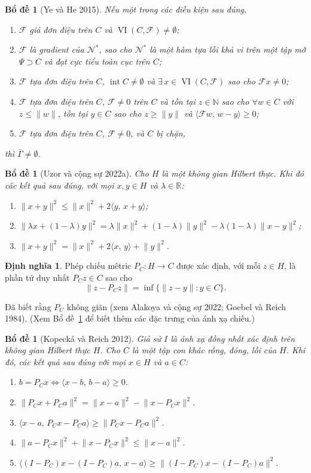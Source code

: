 \documentclass{MyBook}
\theoremstyle{plain}
\newtheorem{lemma}[theorem]{Bổ đề}
\theoremstyle{definition}
\newtheorem{definition}[theorem]{Định nghĩa}
\theoremstyle{remark}
\numberwithin{equation}{chapter}
\newcommand{\Fc}{\mathcal{F}}
\newcommand{\Nc}{\mathcal{N}}
\newcommand{\inp}[2]{\langle #1,\,#2\rangle}
\newcommand{\nm}[1]{\lVert #1\rVert}
\newcommand{\R}{\mathbb{R}}
\newcommand{\N}{\mathbb{N}}
\DeclareMathOperator{\VI}{VI}
\newcommand{\Gam}{\bar{\Gamma}}
\begin{document}
\begin{lemma}[Ye và He 2015]\label{lem:2.4}
Nếu một trong các điều kiện sau đúng,
\begin{enumerate}[label=(\roman*)]
\item $\Fc$ giả đơn điệu trên $C$ và $\VI(C,\Fc)\ne\emptyset$;
\item $\Fc$ là gradient của $\Nc^{*}$, sao cho $\Nc^{*}$ là một hàm tựa lồi khả vi trên một tập mở $\Psi\supset C$ và đạt cực tiểu toàn cục trên $C$;
\item $\Fc$ tựa đơn điệu trên $C$, $\operatorname{int}C\ne\emptyset$ và $\exists\,x\in\VI(C,\Fc)$ sao cho $\Fc x\ne 0$;
\item $\Fc$ tựa đơn điệu trên $C$, $\Fc\ne 0$ trên $C$ và tồn tại $z\in\N$ sao cho $\forall w\in C$ với $z\le\nm{w}$, tồn tại $y\in C$ sao cho $z\ge\nm{y}$ và $\inp{\Fc w}{w-y}\ge 0$;
\item $\Fc$ tựa đơn điệu trên $C$, $\Fc\ne 0$, và $C$ bị chặn,
\end{enumerate}
thì $\Gam\ne\emptyset$.
\end{lemma}

\begin{lemma}[Uzor và cộng sự 2022a]\label{lem:2.5}
Cho $H$ là một không gian Hilbert thực. Khi đó các kết quả sau đúng, với mọi $x,y\in H$ và $\lambda\in\R$:
\begin{enumerate}[label=(\roman*)]
\item $\nm{x+y}^2\le\nm{x}^2+2\inp{y}{x+y}$;
\item $\nm{\lambda x+(1-\lambda)y}^2=\lambda\nm{x}^2+(1-\lambda)\nm{y}^2-\lambda(1-\lambda)\nm{x-y}^2$;
\item $\nm{x+y}^2=\nm{x}^2+2\inp{x}{y}+\nm{y}^2$.
\end{enumerate}
\end{lemma}

\begin{definition}
Phép chiếu mêtric $P_C:H\to C$ được xác định, với mỗi $z\in H$, là phần tử duy nhất $P_Cz\in C$ sao cho
\[
\nm{z-P_Cz}=\inf\{\nm{z-y}:y\in C\}.
\]
\end{definition}
Đã biết rằng $P_C$ không giãn (xem Alakoya và cộng sự 2022; Goebel và Reich 1984). (Xem Bổ đề~\ref{lem:2.7} để biết thêm các đặc trưng của ánh xạ chiếu.)

\begin{lemma}[Kopecká và Reich 2012]\label{lem:2.7}
Giả sử $I$ là ánh xạ đồng nhất xác định trên không gian Hilbert thực $H$. Cho $C$ là một tập con khác rỗng, đóng, lồi của $H$. Khi đó, các kết quả sau đúng với mọi $x\in H$ và $a\in C$:
\begin{enumerate}[label=(\roman*)]
\item $b=P_Cx\iff\inp{x-b}{b-a}\ge 0$.
\item $\nm{P_Cx+P_Ca}^2=\nm{x-a}^2-\nm{x-P_Cx}^2$.
\item $\inp{x-a}{P_Cx-P_Ca}\ge\nm{P_Cx-P_Ca}^2$.
\item $\nm{a-P_Cx}^2+\nm{x-P_Cx}^2\le\nm{x-a}^2$.
\item $\inp{(I-P_C)x-(I-P_C)a}{x-a}\ge\nm{(I-P_C)x-(I-P_C)a}^2$.
\end{enumerate}
\end{lemma}
\end{document}
